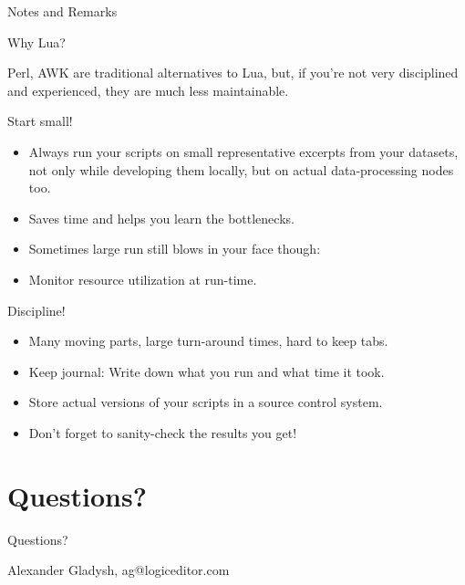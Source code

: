 \documentclass[handout]{beamer}
\begin{document}
\begin{frame}
\huge Notes and Remarks
\end{frame}


\begin{frame}{Why Lua?}

Perl, AWK are traditional alternatives to Lua,
but, if you're not very disciplined and experienced,
they are much less maintainable.

\end{frame}


\begin{frame}{Start small!}

\begin{itemize}
\item Always run your scripts on small representative excerpts
      from your datasets, not only while developing them locally,
      but on actual data-processing nodes too.
\item Saves time and helps you learn the bottlenecks.
\item Sometimes large run still blows in your face though:
\item Monitor resource utilization at run-time.
\end{itemize}

\end{frame}


\begin{frame}{Discipline!}

\begin{itemize}
\item Many moving parts, large turn-around times, hard to keep tabs.
\item Keep journal: Write down what you run and what time it took.
\item Store actual versions of your scripts in a source control system.
\item Don't forget to sanity-check the results you get!
\end{itemize}

\end{frame}


\section{Questions?}


\begin{frame}{Questions?}

Alexander Gladysh,
ag@logiceditor.com

\end{frame}

\end{document}
